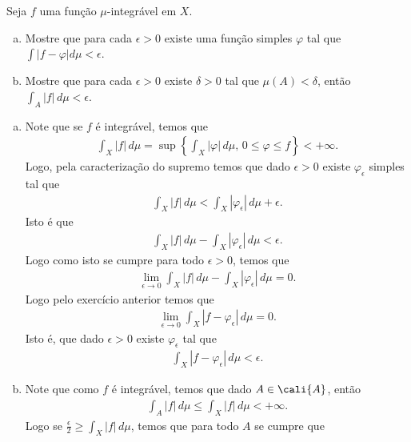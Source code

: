 \begin{homeworkProblem}[5]
  Seja $f$ uma função $\mu$-integrável em $X$.
  \begin{enumerate}[a)]
    \item Mostre que para cada $\epsilon>0$ existe uma função simples $\varphi$ tal que $\int |f-\varphi|d\mu<\epsilon$.
    \item Mostre que para cada $\epsilon>0$ existe $\delta>0$ tal que $\mu(A)<\delta$, então $\int_{A}|f|\,d\mu <\epsilon$. 
  \end{enumerate}
  \begin{solution}
  \begin{enumerate}[a)]
    \item Note que se $f$ é integrável, temos que
      \begin{align*}
        \int_{X}|f|\,d\mu =\sup\left\{ \int_{X}|\varphi|\,d\mu,\, 0\leq \varphi\leq f \right\}<+\infty.
      \end{align*}
      Logo, pela caracterização do supremo temos que dado $\epsilon>0$ existe $\varphi_\epsilon$ simples tal que
      \begin{align*}
        \int_{X}|f|\,d\mu < \int_{X}|\varphi_{\epsilon}|\,d\mu +\epsilon. 
      \end{align*}
      Isto é que
      \begin{align*}
        \int_{X}|f|\,d\mu - \int_{X}|\varphi_{\epsilon}|\,d\mu <\epsilon.
      \end{align*}
      Logo como isto se cumpre para todo $\epsilon>0$, temos que
      \begin{align*}
        \lim_{\epsilon \to 0}\int_{X}|f|\,d\mu - \int_{X}|\varphi_{\epsilon}|\,d\mu =0.
      \end{align*}
      Logo pelo exercício anterior temos que
      \begin{align*}
        \lim_{\epsilon \to 0}\int_{X}|f-\varphi_\epsilon|\,d\mu=0.
      \end{align*}
      Isto é, que dado $\epsilon>0$ existe $\varphi_\epsilon$ tal que
      \begin{align*}
        \int_{X}|f-\varphi_\epsilon|\,d\mu<\epsilon.
      \end{align*}
    \item Note que como $f$ é integrável, temos que dado $A\in\cali{A}$, então
      \begin{align*}
        \int_{A}|f|\,d\mu \leq \int_{X}|f|\,d\mu <+\infty.
      \end{align*}
      Logo se $\frac{\epsilon}{2}\geq \int_{X}|f|\,d\mu$, temos que para todo $A$ se cumpre que

\end{enumerate}
\end{solution}
\end{homeworkProblem}
